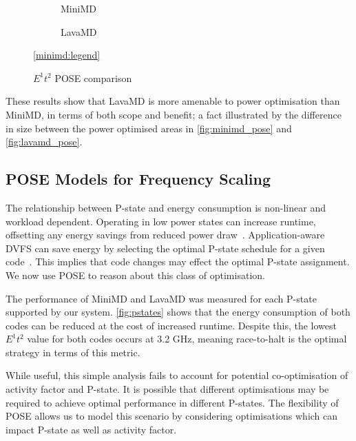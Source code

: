 \begin{figure*}[t]%
  \scriptsize
  \begin{subfigure}[t]{.5\linewidth}%
    \caption{MiniMD}%
    \label{fig:minimd_pose}
  \end{subfigure}%
  \begin{subfigure}[t]{.5\linewidth}%
    \caption{LavaMD}%
    \label{fig:lavamd_pose}
  \end{subfigure}%
  \begin{center}%
    \ref{minimd:legend}%
  \end{center}%
  \caption{$E^1t^2$ POSE comparison}%
  \label{fig:comparison}%
\end{figure*}

These results show that LavaMD is more amenable to power optimisation than MiniMD, in terms of both scope and benefit; a fact illustrated by the difference in size between the power optimised areas in \autoref{fig:minimd_pose} and \autoref{fig:lavamd_pose}.

\subsection{POSE Models for Frequency Scaling}
\noindent
The relationship between P-state and energy consumption is non-linear and workload dependent.
Operating in low power states can increase runtime, offsetting any energy savings from reduced power draw~\cite{le:2010aa}.
Application-aware DVFS can save energy by selecting the optimal P-state schedule for a given code~\cite{choi:2004aa}.
This implies that code changes may effect the optimal P-state assignment. 
We now use POSE to reason about this class of optimisation.

The performance of MiniMD and LavaMD was measured for each P-state supported by our system.
\autoref{fig:pstates} shows that the energy consumption of both codes can be reduced at the cost of increased runtime.
Despite this, the lowest $E^1t^2$ value for both codes occurs at 3.2 GHz, meaning race-to-halt is the optimal strategy in terms of this metric. 

While useful, this simple analysis fails to account for potential co-opti\-misa\-tion of activity factor and P-state.
It is possible that different optimisations may be required to achieve optimal performance in different P-states.
The flexibility of POSE allows us to model this scenario by considering optimisations which can impact P-state as well as activity factor.

